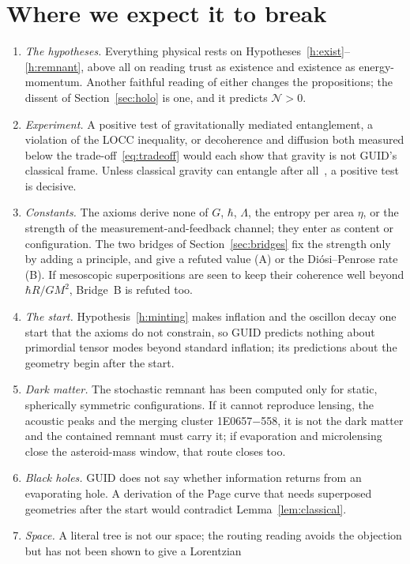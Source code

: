 \documentclass[11pt,a4paper]{article}
\theoremstyle{definition}
\theoremstyle{remark}
\theoremstyle{definition}
\begin{document}
\section{Where we expect it to break}\label{sec:break}
\begin{enumerate}[nosep]
\item \emph{The hypotheses.} Everything physical rests on Hypotheses~\ref{h:exist}--\ref{h:remnant}, above all on reading trust as existence
and existence as energy-momentum. Another faithful reading of either changes the propositions; the dissent of Section~\ref{sec:holo} is one,
and it predicts $\mathcal N>0$.
\item \emph{Experiment.} A positive test of gravitationally mediated entanglement, a violation of the LOCC inequality, or decoherence and
diffusion both measured below the trade-off~\eqref{eq:tradeoff} would each show that gravity is not GUID's classical frame. Unless classical
gravity can entangle after all~\cite{azizhowl}, a positive test is decisive.
\item \emph{Constants.} The axioms derive none of $G$, $\hbar$, $\Lambda$, the entropy per area $\eta$, or the strength of the
measurement-and-feedback channel; they enter as content or configuration. The two bridges of Section~\ref{sec:bridges} fix the strength
only by adding a principle, and give a refuted value (A) or the Di\'osi--Penrose rate (B). If mesoscopic superpositions are seen to keep
their coherence well beyond $\hbar R/GM^2$, Bridge~B is refuted too.
\item \emph{The start.} Hypothesis~\ref{h:minting} makes inflation and the oscillon decay one start that the axioms do not constrain, so GUID
predicts nothing about primordial tensor modes beyond standard inflation; its predictions about the geometry begin after the start.
\item \emph{Dark matter.} The stochastic remnant has been computed only for static, spherically symmetric configurations. If it cannot
reproduce lensing, the acoustic peaks and the merging cluster 1E0657$-$558, it is not the dark matter and the contained remnant must carry
it; if evaporation and microlensing close the asteroid-mass window, that route closes too.
\item \emph{Black holes.} GUID does not say whether information returns from an evaporating hole. A derivation of the Page curve that needs
superposed geometries after the start would contradict Lemma~\ref{lem:classical}.
\item \emph{Space.} A literal tree is not our space; the routing reading avoids the objection but has not been shown to give a Lorentzian

\end{enumerate}
\end{document}
